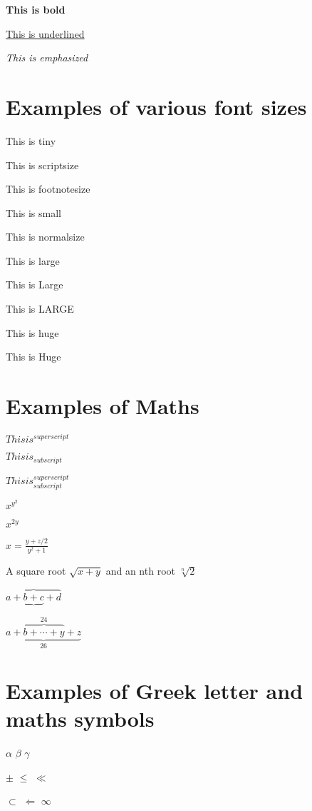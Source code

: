 \documentclass{article}
\begin{document}
{\bf This is bold}

\underline{This is underlined}

\emph{This is emphasized}

\section{Examples of various font sizes}

\tiny This is tiny

\scriptsize This is scriptsize

\footnotesize This is footnotesize

\small This is small

\normalsize This is normalsize

\large This is large

\Large This is Large

\LARGE This is LARGE

\huge This is huge

\Huge This is Huge

\normalsize

\section{Examples of Maths}

$Thisis^{superscript}$

$Thisis_{subscript}$

$Thisis_{subscript}^{superscript}$

$x^{y^{2}}$

$x^{2y}$

$x = \frac{y+z/2}{y^{2}+1}$

A square root $\sqrt{x+y}$ and an nth root $\sqrt[n]{2}$

\vspace*{1cm}

$\overbrace{a+ \underbrace{b + c} + d}$

\vspace*{1cm}

$\underbrace{a + \overbrace{b + \cdots + y}^{24} + z}_{26}$

\section{Examples of Greek letter and maths symbols}

 $\alpha$ $\beta$ $\gamma$

$\pm$ $\leq$ $\ll$

$\subset$ $\Leftarrow$ $\infty$
\end{document}
